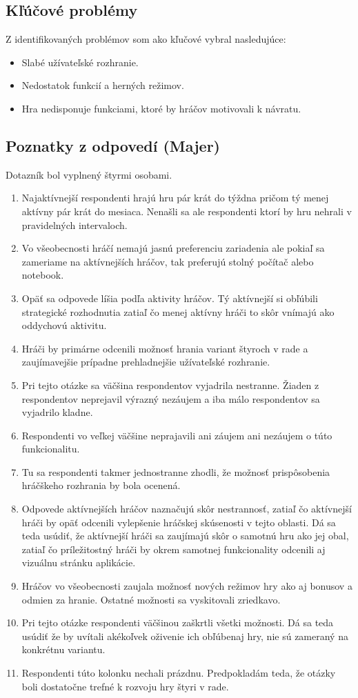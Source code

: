 \documentclass[a4paper, 11pt, onecolumn]{article}
\begin{document}
\subsection*{Kľúčové problémy}
Z identifikovaných problémov som ako kľučové vybral nasledujúce:
\begin{itemize}
    \item Slabé užívateľské rozhranie.
    \item Nedostatok funkcií a herných režimov.
    \item Hra nedisponuje funkciami, ktoré by hráčov motivovali k návratu.
\end{itemize}
\subsection{Poznatky z odpovedí (Majer)}
Dotazník bol vyplnený štyrmi osobami.
\begin{enumerate}
  \item Najaktívnejší respondenti hrajú hru pár krát do týždna pričom tý menej aktívny pár krát do mesiaca. Nenašli sa
          ale respondenti ktorí by hru nehrali v pravidelných intervaloch.
  \item Vo všeobecnosti hráčí nemajú jasnú preferenciu zariadenia ale pokiaľ sa zameriame na aktívnejších hráčov, tak preferujú stolný počítač alebo notebook.
  \item Opäť sa odpovede líšia podľa aktivity hráčov. Tý aktívnejší si obľúbili strategické rozhodnutia zatiaľ čo menej aktívny hráči to skôr vnímajú ako oddychovú aktivitu.
  \item Hráči by primárne odcenili možnosť hrania variant štyroch v rade a zaujímavejšie prípadne prehladnejšie užívateľské rozhranie.
  \item Pri tejto otázke sa väčšina respondentov vyjadrila nestranne. Žiaden z respondentov neprejavil výrazný nezáujem a iba málo respondentov sa vyjadrilo kladne.
  \item Respondenti vo veľkej väčšine neprajavili ani záujem ani nezáujem o túto funkcionalitu.
  \item Tu sa respondenti takmer jednostranne zhodli, že možnosť prispôsobenia hráčškeho rozhrania by bola ocenená.
  \item Odpovede aktívnejších hráčov naznačujú skôr nestrannosť, zatiaľ čo aktívnejší hráči by opäť odcenili vylepšenie hráčskej skúsenosti v tejto oblasti.
            Dá sa teda usúdiť, že aktívnejší hráči sa zaujímajú skôr o samotnú hru ako jej obal, zatiaľ čo príležitostný hráči by okrem samotnej funkcionality odcenili aj vizuálnu stránku aplikácie.
  \item Hráčov vo všeobecnosti zaujala možnosť nových režimov hry ako aj bonusov a odmien za hranie. Ostatné možnosti 
      sa vyskitovali zriedkavo.
  \item Pri tejto otázke respondenti väčšinou zaškrtli všetki možnosti. Dá sa teda usúdiť že by uvítali akékoľvek oživenie ich obľúbenaj hry, nie sú zameraný na konkrétnu variantu.
  \item Respondenti túto kolonku nechali prázdnu. Predpokladám teda, že otázky boli dostatočne trefné k rozvoju hry štyri v rade.
\end{enumerate}
\end{document}
